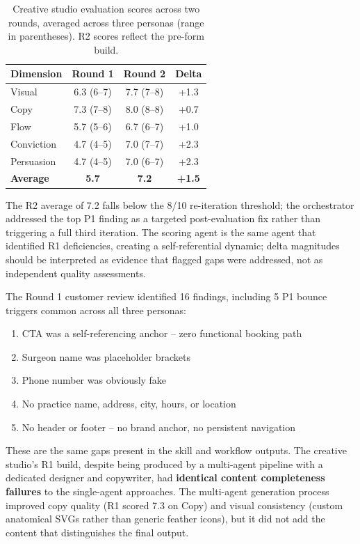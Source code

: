 \documentclass[conference]{IEEEtran}
\providecommand{\tightlist}{%
  \setlength{\itemsep}{0pt}\setlength{\parskip}{0pt}}
\begin{document}
\begin{table}[htbp]
\caption{Creative studio evaluation scores across two rounds, averaged across
three personas (range in parentheses). R2 scores reflect the pre-form
build.}
\centering
\small
\begin{tabular}{lccc}
\toprule
Dimension & Round 1 & Round 2 & Delta \\
\midrule
Visual & 6.3 (6--7) & 7.7 (7--8) & +1.3 \\
Copy & 7.3 (7--8) & 8.0 (8--8) & +0.7 \\
Flow & 5.7 (5--6) & 6.7 (6--7) & +1.0 \\
Conviction & 4.7 (4--5) & 7.0 (7--7) & +2.3 \\
Persuasion & 4.7 (4--5) & 7.0 (6--7) & +2.3 \\
\textbf{Average} & \textbf{5.7} & \textbf{7.2} & \textbf{+1.5} \\
\bottomrule
\end{tabular}
\end{table}

The R2 average of 7.2 falls below the 8/10 re-iteration threshold; the orchestrator addressed the top P1 finding as a targeted post-evaluation fix rather than triggering a full third iteration. The scoring agent is the same agent that identified R1 deficiencies, creating a self-referential dynamic; delta magnitudes should be interpreted as evidence that flagged gaps were addressed, not as independent quality assessments.

The Round 1 customer review identified 16 findings, including 5 P1 bounce triggers common across all three personas:

\begin{enumerate}
\def\labelenumi{\arabic{enumi}.}
\tightlist
\item
  CTA was a self-referencing anchor -- zero functional booking path
\item
  Surgeon name was placeholder brackets
\item
  Phone number was obviously fake
\item
  No practice name, address, city, hours, or location
\item
  No header or footer -- no brand anchor, no persistent navigation
\end{enumerate}

These are the same gaps present in the skill and workflow outputs. The creative studio's R1 build, despite being produced by a multi-agent pipeline with a dedicated designer and copywriter, had \textbf{identical content completeness failures} to the single-agent approaches. The multi-agent generation process improved copy quality (R1 scored 7.3 on Copy) and visual consistency (custom anatomical SVGs rather than generic feather icons), but it did not add the content that distinguishes the final output.
\end{document}
